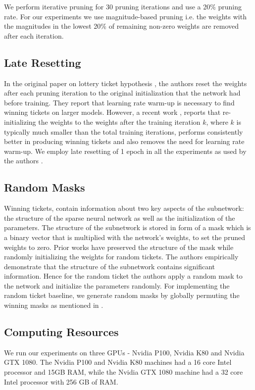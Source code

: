     We perform iterative pruning for 30 pruning iterations and use a 20\% pruning rate. For our experiments we use magnitude-based pruning i.e. the weights with the magnitudes in the lowest 20\% of remaining non-zero weights are removed after each iteration. 
    
    
    \subsection{Late Resetting}
    In the original paper on lottery ticket hypothesis \cite{lth_orig_paper}, the authors reset the weights after each pruning iteration to the original initialization that the network had before training. They report that learning rate warm-up is necessary to find winning tickets on larger models. However, a recent work  \cite{DBLP:journals/corr/abs-1903-01611}, reports that re-initializing the weights to the weights after the training iteration $k$, where $k$ is typically much smaller than the total training iterations, performs consistently better in producing winning tickets and also removes the need for learning rate warm-up. We employ late resetting of 1 epoch in all the experiments as used by the authors \cite{repro_paper}.
    
    
    
    \subsection{Random Masks}
    Winning tickets, contain information about two key aspects of the subnetwork: the structure of the sparse neural network as well as the initialization of the parameters. The structure of the subnetwork is stored in form of a mask which is a binary vector that is multiplied with the network's weights, to set the pruned weights to zero. Prior works have preserved the structure of the mask while randomly initializing the weights for random tickets. The authors \cite{repro_paper} empirically demonstrate that the structure of the subnetwork contains significant information. Hence for the random ticket the authors apply a random mask to the network and initialize the parameters randomly. For implementing the random ticket baseline, we generate random masks by globally permuting the winning masks as mentioned in \cite{repro_paper}. 
    
    
    
    \subsection{Computing Resources}
    We run our experiments on three GPUs - Nvidia P100, Nvidia K80 and Nvidia GTX 1080. The Nvidia P100 and Nvidia K80 machines had a 16 core Intel processor and 15GB RAM, while the Nvidia GTX 1080 machine had a 32 core Intel processor with 256 GB of RAM.
    

